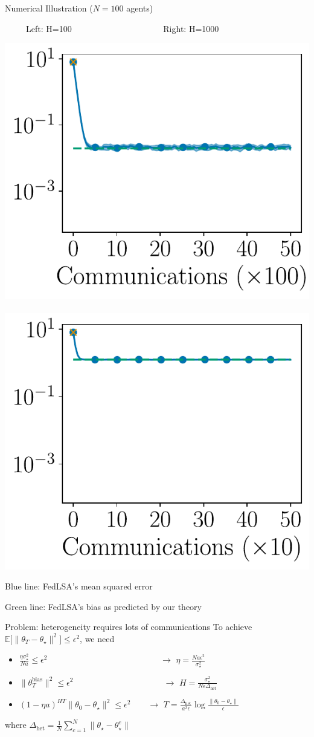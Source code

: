 \documentclass[aspectratio=169,14pt]{beamer}
\begin{document}
\begin{frame}{Numerical Illustration ($N=100$ agents)}
  \vspace{-0.5em}
  
  \begin{center}
    ~~~~~Left: H=100~~~~~~~~~~~~~~~~~~~~~
    Right: H=1000
 
    \vspace{-1em}
   
    \includegraphics[width=0.4\linewidth]{images/plot_hg_100_n100_fedlsa.pdf}
    ~~
    \includegraphics[width=0.4\linewidth]{images/plot_hg_1000_n100_fedlsa.pdf}
  \end{center}

  \vspace{-1em}

  Blue line: FedLSA's mean squared error

  \vspace{-1em}

  Green line: FedLSA's bias as predicted by our theory
\end{frame}


\begin{frame}{Problem: heterogeneity requires lots of communications}
  To achieve $\mathbb{E} \Big[ \| {\theta_T - \theta_\star} \|^2 \Big] \le \epsilon^2$, we need
  \begin{itemize}
  \item $\frac{\eta \sigma_\star^2}{N a} \le \epsilon^2$ ~~~~~~\,~~~~~~~~~~~~~~~~~~~ $\rightarrow$ $\eta = \frac{N a \epsilon^2}{\sigma_\star^2}$
  \item $\| \theta_T^{\text{bias}} \|^2 \le \epsilon^2$ ~~~~~~~~~~~~~~~~~~~~ $\rightarrow$ $H = \frac{\sigma_\star^2 }{N \epsilon \Delta_{\text{het}}}$
  \item $(1 - \eta a)^{H T} \| \theta_0 - \theta_\star \|^2 \le \epsilon^2$ ~~~\,$\rightarrow$ $T = \frac{\Delta_{\text{het}}}{a^2 \epsilon} \log \tfrac{\| \theta_0 - \theta_\star \|}{ \epsilon }$
  \end{itemize}

  where $\Delta_{\text{het}} = \frac{1}{N} \sum_{c=1}^N \| \theta_\star - \theta_\star^c \| $
\end{frame}
\end{document}
